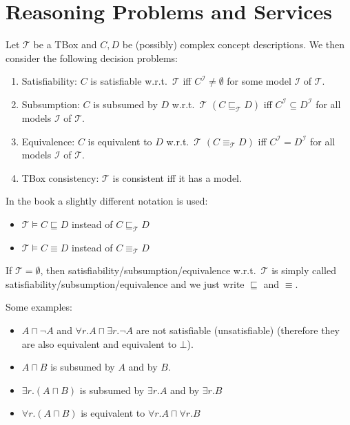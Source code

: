 \section{Reasoning Problems and Services}
\begin{definition}
	Let $\mathcal{T}$ be a TBox and $C,D$ be (possibly) complex concept descriptions.
	We then consider the following decision problems:
	\begin{enumerate}
		\item Satisfiability: $C$ is satisfiable w.r.t.\ $\mathcal{T}$ iff
			$C^{\mathcal{I}} \neq \emptyset$ for some model $\mathcal{I}$ of $\mathcal{T}$.
		\item Subsumption: $C$ is subsumed by $D$ w.r.t.\ $\mathcal{T}$ $\left( C \sqsubseteq_{\mathcal{T}} D \right)$ iff
			$C^{\mathcal{I}} \subseteq D^{\mathcal{I}}$ for all models $\mathcal{I}$ of $\mathcal{T}$.
		\item Equivalence: $C$ is equivalent to $D$ w.r.t.\ $\mathcal{T}$ $\left( C \equiv_{\mathcal{T}} D \right) $ iff
			$C^{\mathcal{I}} = D^{\mathcal{I}}$ for all models $\mathcal{I}$ of $\mathcal{T}$.
		\item TBox consistency: $\mathcal{T}$ is consistent iff it has a model.
	\end{enumerate}
\end{definition}
\begin{notation}
	In the book a slightly different notation is used:
	\begin{itemize}
		\item $\mathcal{T} \vDash C \sqsubseteq D$ instead of $C \sqsubseteq_{\mathcal{T}} D$
		\item $\mathcal{T} \vDash C \equiv D$ instead of $C \equiv_{\mathcal{T}}D$
	\end{itemize}
\end{notation}
\begin{note}
	If $\mathcal{T} = \emptyset$, then satisfiability/subsumption/equivalence w.r.t.\ $\mathcal{T}$ is simply called satisfiability/subsumption/equivalence
	and we just write $\sqsubseteq$ and $\equiv$.	
\end{note}

\begin{example}
	Some examples:
	\begin{itemize}
		\item $A \sqcap \neg A$ and $\forall r.A \sqcap \exists r.\neg A$ are not satisfiable (unsatisfiable) \newline
			(therefore they are also equivalent and equivalent to $\bot$).
		\item $A \sqcap B$ is subsumed by $A$ and by $B$.
		\item $\exists r.(A \sqcap B)$ is subsumed by $\exists r.A$ and by $\exists r.B$
		\item $\forall r.(A \sqcap B)$ is equivalent to $\forall r.A  \sqcap \forall r.B$
	\end{itemize}
\end{example}

